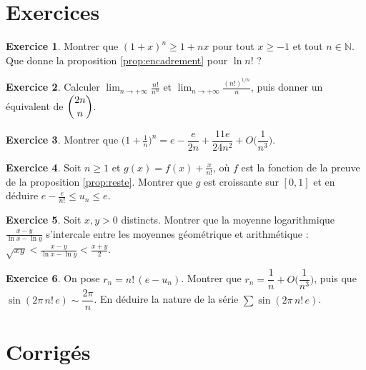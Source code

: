 \documentclass[11pt,a4paper]{article}
\theoremstyle{plain}
\theoremstyle{definition}
\newtheorem{exercice}{Exercice}
\theoremstyle{remark}
\newcommand{\N}{\mathbb{N}}
\begin{document}
\section{Exercices}

\begin{exercice}\label{exo:bernoulli}
Montrer que $(1+x)^n\geq1+nx$ pour tout $x\geq-1$ et tout $n\in\N$. Que donne la proposition \ref{prop:encadrement} pour $\ln n!$ ?
\end{exercice}

\begin{exercice}
Calculer $\displaystyle\lim_{n\to+\infty}\frac{n!}{n^n}$ et $\displaystyle\lim_{n\to+\infty}\frac{(n!)^{1/n}}{n}$, puis donner un équivalent de $\dbinom{2n}{n}$.
\end{exercice}

\begin{exercice}\label{exo:dl}
Montrer que $\big(1+\frac1n\big)^n=e-\dfrac{e}{2n}+\dfrac{11e}{24n^2}+O\Big(\dfrac1{n^3}\Big)$.
\end{exercice}

\begin{exercice}
Soit $n\geq1$ et $g(x)=f(x)+\frac{x}{n!}$, où $f$ est la fonction de la preuve de la proposition \ref{prop:reste}. Montrer que $g$ est croissante sur $[0,1]$ et en déduire $e-\frac e{n!}\leq u_n\leq e$.
\end{exercice}

\begin{exercice}
Soit $x,y>0$ distincts. Montrer que la moyenne logarithmique $\frac{x-y}{\ln x-\ln y}$ s'intercale entre les moyennes géométrique et arithmétique : $\sqrt{xy}<\frac{x-y}{\ln x-\ln y}<\frac{x+y}2$.
\end{exercice}

\begin{exercice}\label{exo:sin}
On pose $r_n=n!\,(e-u_n)$. Montrer que $r_n=\dfrac1n+O\Big(\dfrac1{n^3}\Big)$, puis que $\sin(2\pi\,n!\,e)\sim\dfrac{2\pi}n$. En déduire la nature de la série $\sum\sin(2\pi\,n!\,e)$.
\end{exercice}

\section{Corrigés}
\end{document}
